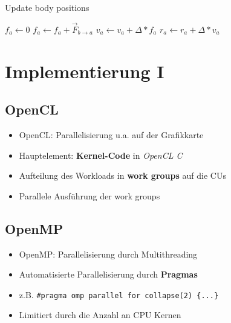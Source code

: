 \documentclass{beamer}
\begin{document}
\begin{frame}


\begin{algorithm}[H]
\caption{Update body positions}
\begin{algorithmic}[1]
      \State $f_a \gets 0$ 
        \State $f_a \gets f_a + \vec{F}^{\,}_{b\rightarrow a}$ 
      \EndFor
   \EndFor
      \State $v_a \gets v_a + \Delta * f_a$ 
      \State $r_a \gets r_a + \Delta * v_a$ 
   \EndFor
\EndProcedure
\end{algorithmic}
\end{algorithm}


\end{frame}

\section{Implementierung I}

\subsection{OpenCL}
\begin{frame}
\begin{itemize}
  \item OpenCL: Parallelisierung u.a. auf der Grafikkarte
  \item Hauptelement: \textbf{Kernel-Code} in \textit{OpenCL C}
  \item Aufteilung des Workloads in \textbf{work groups} auf die CUs
  \item Parallele Ausführung der work groups
\end{itemize}
\end{frame}

\subsection{OpenMP}
\begin{frame}
\begin{itemize}
  \item OpenMP: Parallelisierung durch Multithreading
  \item Automatisierte Parallelisierung durch \textbf{Pragmas}
  \item z.B. \texttt{\#pragma omp parallel for collapse(2) \{...\}}
  \item Limitiert durch die Anzahl an CPU Kernen
\end{itemize}
\end{frame}
\end{document}
